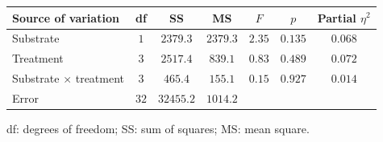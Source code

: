 \begin{tabular}{lcccccc}
\hline\hline
\textbf{Source of variation} & \textbf{df} & \textbf{SS} & \textbf{MS} & \textbf{$F$} & \textbf{$p$} & \textbf{Partial $\eta^2$} \\
\hline
Substrate & $1$ & $2379.3$ & $2379.3$ & $2.35$ & $0.135$ & $0.068$ \\
Treatment & $3$ & $2517.4$ & $839.1$ & $0.83$ & $0.489$ & $0.072$ \\
Substrate $\times$ treatment & $3$ & $465.4$ & $155.1$ & $0.15$ & $0.927$ & $0.014$ \\
Error & $32$ & $32455.2$ & $1014.2$ &  &  &  \\
\hline
\end{tabular}
\par\vspace{4pt}
\parbox{0.94\linewidth}{\footnotesize df: degrees of freedom; SS: sum of squares; MS: mean square.}
